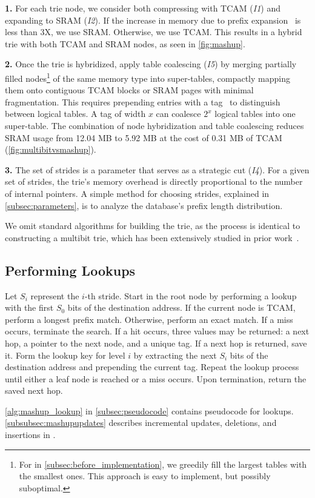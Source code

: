{\bf 1.} For each trie node, we consider both compressing with TCAM ({\em I1}) and expanding to SRAM ({\em I2}). If the increase in memory due to prefix expansion~\cite{prefix_expansion} is less than 3X, we use SRAM. Otherwise, we use TCAM. This results in a hybrid trie with both TCAM and SRAM nodes, as seen in \cref{fig:mashup}.

{\bf 2.} Once the trie is hybridized, apply table coalescing ({\em I5}) by merging partially filled nodes\footnote{For \mashup in \cref{subsec:before_implementation}, we greedily fill the largest tables with the smallest ones. This approach is easy to implement, but possibly suboptimal.} of the same memory type into super-tables, compactly mapping them onto contiguous TCAM blocks or SRAM pages with minimal fragmentation. This requires prepending entries with a tag~\cite{tag_bits} to distinguish between logical tables. A tag of width $x$ can coalesce $2^x$ logical tables into one super-table. The combination of node hybridization and table coalescing reduces SRAM usage from 12.04 MB to 5.92 MB at the cost of 0.31 MB of TCAM (\cref{fig:multibitvsmashup}).

{\bf 3.} The set of strides is a parameter that serves as a strategic cut ({\em I4}). For a given set of strides, the trie's memory overhead is directly proportional to the number of internal pointers. A simple method for choosing strides, explained in \cref{subsec:parameters}, is to analyze the database's prefix length distribution.

We omit standard algorithms for building the \mashup trie, as the process is identical to constructing a multibit trie, which has been extensively studied in prior work~\cite{prefix_expansion, network_algorithmics}.

\subsection{Performing Lookups} \label{subsec:mashup_lookups}

Let $S_i$ represent the $i$-th stride. Start in the root node by performing a lookup with the first $S_0$ bits of the destination address. If the current node is TCAM, perform a longest prefix match. Otherwise, perform an exact match. If a miss occurs, terminate the search. If a hit occurs, three values may be returned: a next hop, a pointer to the next node, and a unique tag. If a next hop is returned, save it. Form the lookup key for level $i$ by extracting the next $S_i$ bits of the destination address and prepending the current tag. Repeat the lookup process until either a leaf node is reached or a miss occurs. Upon termination, return the saved next hop.

\cref{alg:mashup_lookup} in \cref{subsec:pseudocode} contains pseudocode for \mashup lookups. \cref{subsubsec:mashupupdates} describes incremental updates, deletions, and insertions in \mashup.